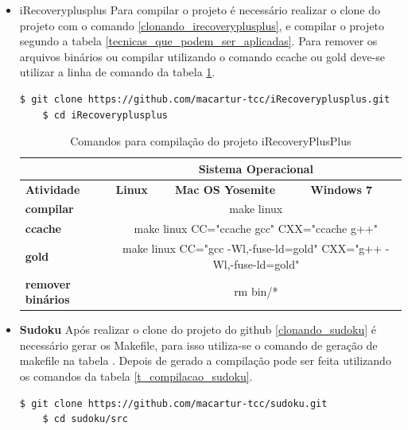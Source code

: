 \begin{itemize}
       \item {iRecoveryplusplus}
		\subitem Para compilar o projeto é necessário realizar o clone do projeto
 com o comando \ref{clonando_irecoveryplusplus}, e compilar o projeto
 segundo a tabela \ref{tecnicas_que_podem_ser_aplicadas}.
 Para remover os arquivos binários ou compilar utilizando o comando ccache
 ou gold deve-se utilizar a linha de comando da tabela \ref{t_compilacao_irecoveryplusplus}.

\begin{lstlisting}[language=bash, caption={Clonado Projeto iRecoveryplusplus},
                  label=clonando_irecoveryplusplus]
    $ git clone https://github.com/macartur-tcc/iRecoveryplusplus.git 
    $ cd iRecoveryplusplus
\end{lstlisting}


\begin{table}[h]
\begin{tabular}{p{2cm}p{2cm}p{2cm}p{2cm}}
\toprule
 & \multicolumn{3}{c}{Sistema Operacional} \\ \toprule 
\textbf{Atividade} & \textbf{Linux} & \textbf{Mac OS Yosemite} & \textbf{Windows 7}  \\ \midrule 
\textbf{compilar} & \multicolumn{3}{c}{make linux} \\ \midrule
\textbf{ccache} & \multicolumn{3}{c}{make linux CC="ccache gcc" CXX="ccache g++"} \\ \midrule
\textbf{gold} & \multicolumn{3}{c}{make linux  CC="gcc -Wl,-fuse-ld=gold" CXX="g++ -Wl,-fuse-ld=gold"} \\ \midrule
\textbf{remover binários} & \multicolumn{3}{c}{rm bin/*} \\ \bottomrule
\end{tabular} 
\caption{Comandos para compilação do projeto iRecoveryPlusPlus}
\label{t_compilacao_irecoveryplusplus}
\end{table}

    \item \textbf{Sudoku}
    \subitem Após realizar o clone do projeto do github
 \ref{clonando_sudoku} é necessário  gerar os Makefile,
 para isso utiliza-se o comando de geração de makefile na tabela .
Depois de gerado a compilação pode ser feita utilizando
 os comandos da tabela \ref{t_compilacao_sudoku}.

    
\begin{lstlisting}[language=bash, caption={Clonado Projeto iRecoveryplusplus},
                  label=clonando_sudoku]
    $ git clone https://github.com/macartur-tcc/sudoku.git 
    $ cd sudoku/src
\end{lstlisting}



\end{itemize}
